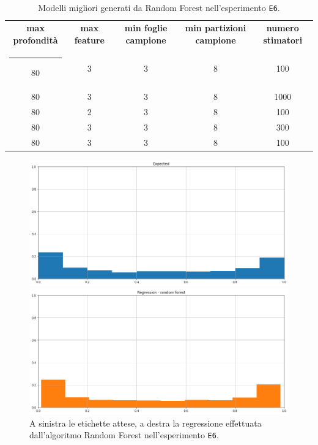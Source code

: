 \documentclass[12pt]{report}
\makeatletter
\theoremstyle{definition}
\newcommand{\thickhline}{%
    \noalign {\ifnum 0=`}\fi \hrule height 1pt
    \futurelet \reserved@a \@xhline
}
\makeatother
\begin{document}
\begin{table}
\centering
\begin{adjustbox}{max width=\textwidth}
 \begin{tabular}{|c|c|c|c|c|} 
 \hline
\textbf{max profondità} & \textbf{max feature} & \textbf{min foglie campione} & \textbf{min partizioni campione} & \textbf{numero stimatori}
\\ [0.5ex] 
 \thickhline
 80 & 3 & 3 & 8 & 100 \\ 
 80 & 3 & 3 & 8 & 1000 \\ 
 80 & 2 & 3 & 8 & 100 \\ 
 80 & 3 & 3 & 8 & 300 \\ 
 80 & 3 & 3 & 8 & 100 \\ 
 \hline
\end{tabular}
\end{adjustbox}
\caption{Modelli migliori generati da Random Forest nell'esperimento \texttt{E6}.}
\label{models_rf_exp6}
\end{table}

\begin{figure}
\centering
    \begin{minipage}{0.48\textwidth}
        \includegraphics[width=\linewidth]{images/experiment_beta05_sovrapposti/expected_memberships.png}
    \end{minipage}
    \begin{minipage}{0.48\textwidth}
        \includegraphics[width=\linewidth]{images/experiment_beta05_sovrapposti/prediction_regression_rf.png}
    \end{minipage}
    \caption{A sinistra le etichette attese, a destra la regressione effettuata dall'algoritmo Random Forest nell'esperimento \texttt{E6}.}
    \label{rf_exp6}
\end{figure} 
\end{document}
